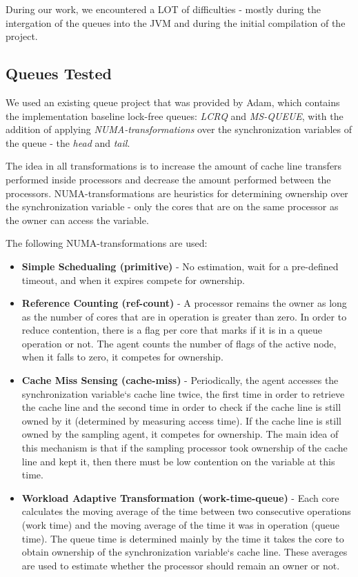 \documentclass{article}
\begin{document}
 During our work, we encountered a LOT of difficulties - mostly during the intergation of the queues into the JVM and during the initial compilation of the project.

 \subsection{Queues Tested}

 We used an existing queue project that was provided by Adam, which contains the implementation baseline lock-free queues: \textit{LCRQ\cite{LCRQ}} and \textit{MS-QUEUE}\cite{MSQUEUE}, with the addition of applying \textit{NUMA-transformations} over the synchronization variables of the queue - the \textit{head} and \textit{tail}.

 The idea in all transformations is to increase the amount of cache line transfers performed inside processors and decrease the amount performed between the processors.
 NUMA-transformations are heuristics for determining ownership over the synchronization variable - only the cores that are on the same processor as the owner can access the variable.

 The following NUMA-transformations are used: 

 \begin{itemize}
	 \item \textbf{Simple Schedualing (primitive)} - No estimation, wait for a pre-defined timeout, and when it expires compete for ownership.
   \item \textbf{Reference Counting (ref-count)} - A processor remains the owner as long as the number of cores that are in operation is greater than zero. In order to reduce contention, there is a flag per core
	 that marks if it is in a queue operation or not. The agent counts the number of flags
	 of the active node, when it falls to zero, it competes for ownership.
 \item \textbf{Cache Miss Sensing (cache-miss)} - Periodically, the agent accesses the synchronization variable`s
	   cache line twice, the first time in order to retrieve the cache line and the second time
	   in order to check if the cache line is still owned by it (determined by measuring access
	   time). If the cache line is still owned by the sampling agent, it competes for ownership.
	   The main idea of this mechanism is that if the sampling processor took ownership of
	   the cache line and kept it, then there must be low contention on the variable at this
	   time.
   \item \textbf{Workload Adaptive Transformation (work-time-queue)} - Each core calculates
	   the moving average of the time between two consecutive operations (work time) and the
	   moving average of the time it was in operation (queue time). The queue time is determined
	   mainly by the time it takes the core to obtain ownership of the synchronization variable`s
	   cache line. These averages are used to estimate whether the processor should remain an
	   owner or not.
 \end{itemize}
\end{document}
